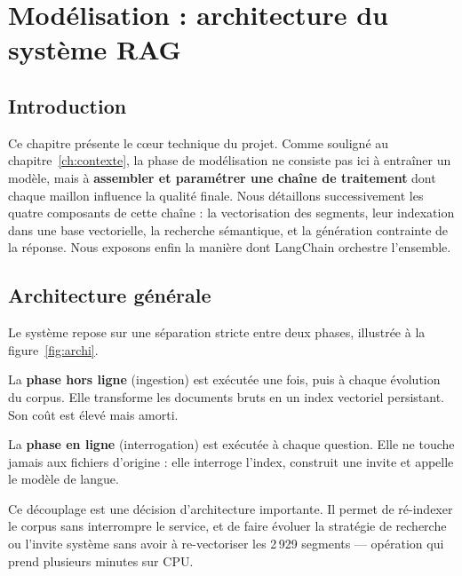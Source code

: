 \chapter{Modélisation : architecture du système RAG}
\label{ch:modelisation}

\section{Introduction}

Ce chapitre présente le cœur technique du projet. Comme souligné au
chapitre~\ref{ch:contexte}, la phase de modélisation ne consiste pas ici à
entraîner un modèle, mais à \textbf{assembler et paramétrer une chaîne de
traitement} dont chaque maillon influence la qualité finale. Nous détaillons
successivement les quatre composants de cette chaîne : la vectorisation des
segments, leur indexation dans une base vectorielle, la recherche sémantique, et
la génération contrainte de la réponse. Nous exposons enfin la manière dont
LangChain orchestre l'ensemble.

\section{Architecture générale}

Le système repose sur une séparation stricte entre deux phases, illustrée à la
figure~\ref{fig:archi}.

La \textbf{phase hors ligne} (ingestion) est exécutée une fois, puis à chaque
évolution du corpus. Elle transforme les documents bruts en un index vectoriel
persistant. Son coût est élevé mais amorti.

La \textbf{phase en ligne} (interrogation) est exécutée à chaque question. Elle
ne touche jamais aux fichiers d'origine : elle interroge l'index, construit une
invite et appelle le modèle de langue.

Ce découplage est une décision d'architecture importante. Il permet de
ré-indexer le corpus sans interrompre le service, et de faire évoluer la
stratégie de recherche ou l'invite système sans avoir à re-vectoriser les
2\,929 segments --- opération qui prend plusieurs minutes sur CPU.

